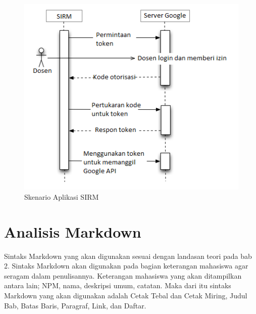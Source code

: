 \begin{figure}[H]
\centering
\includegraphics[scale=1]{Gambar/skenarioaplikasisirm.png}
\caption[Skenario Aplikasi SIRM]{Skenario Aplikasi SIRM} 
\label{fig:skenarioaplikasisirm}
\end{figure}

\section{Analisis Markdown}
\label{sec:analisisMarkdown}
Sintaks Markdown yang akan digunakan sesuai dengan landasan teori pada bab 2. Sintaks Markdown akan digunakan pada bagian keterangan mahasiswa agar seragam dalam penulisannya. Keterangan mahasiswa yang akan ditampilkan antara lain; NPM, nama, deskripsi umum, catatan. Maka dari itu sintaks Markdown yang akan digunakan adalah Cetak Tebal dan Cetak Miring, Judul Bab, Batas Baris, Paragraf, Link, dan Daftar.

